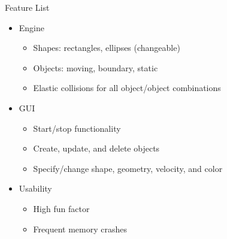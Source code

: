 \documentclass{beamer}
\begin{document}
\begin{frame}{Feature List}
	\begin{itemize}
		\item Engine
		\begin{itemize}
			\item Shapes: rectangles, ellipses (changeable)
			\item Objects: moving, boundary, static
			\item Elastic collisions for all object/object combinations
		\end{itemize}
		
		\vspace*{1em}
		\item GUI
		\begin{itemize}
			\item Start/stop functionality
			\item Create, update, and delete objects
			\item Specify/change shape, geometry, velocity, and color
		\end{itemize}
		
		\vspace*{1em}
		\item Usability
		\begin{itemize}
			\item High fun factor
			\item Frequent memory crashes
		\end{itemize}
	\end{itemize}
\end{frame}
\end{document}
